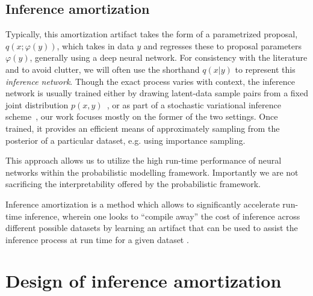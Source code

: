 \documentclass[12pt]{article}
\begin{document}
\subsection{Inference amortization}



Typically, this amortization
artifact takes the form of a parametrized proposal, $q(x ; \varphi(y))$, which takes
in data $y$ and regresses these to proposal parameters $\varphi(y)$, generally using
a deep neural network.
For consistency with the literature and to avoid clutter, we will often
use the shorthand $q(x|y)$ to represent this \emph{inference network}.
Though the exact process varies with context,
the inference network is usually trained either by drawing latent-data
sample pairs from a fixed joint distribution
$p(x,y)$~\citep{ritchie2016deep,PaigeWood2016,LeEtAl2016}, or 
as part of a stochastic variational inference scheme~\citep{HoffmanEtAl2013,VAE,RezendeEtAl2014},
our work focuses mostly on the former of the two settings.
Once trained, it provides an efficient means of approximately
sampling from the posterior of a particular dataset, e.g. using importance sampling.

This approach allows us to utilize the high run-time performance of neural networks within the probabilistic modelling framework. 
Importantly we are not sacrificing the interpretability offered by the probabilistic framework.


Inference amortization is a method which allows to significantly accelerate run-time inference, wherein one looks to ``compile away'' the cost of inference
across different possible datasets
by learning an artifact that can be used to assist the inference process
at run time for a given dataset
\citep{StuhlmullerEtAl2013, VAE, ritchie2016deep, PaigeWood2016, LeEtAl2016, LeEtAl2017, FIVO, NaessethEtAl2017}.




\section{Design of inference amortization}
\label{sec:design}
\end{document}
